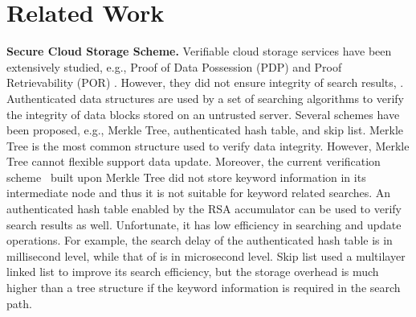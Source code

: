   \section{Related Work}
  \noindent\textbf{Secure Cloud Storage Scheme.} Verifiable cloud storage services have been extensively studied, e.g., Proof of Data Possession (PDP) \cite{ateniese2007provable, ateniese2008scalable, erway2015dynamic,zhu2012cooperative} and Proof  Retrievability (POR) \cite{juels2007pors, bowers2009proofs, stefanov2012iris}.  However, they did not ensure  integrity of search results,  .
  Authenticated data structures are used by a set of searching algorithms to verify the integrity of data blocks stored on an untrusted server. Several schemes have been proposed, e.g., Merkle Tree\cite{merkle1987digital}, authenticated hash table\cite{papamanthou2008authenticated}, and  skip list\cite{pugh1990skip,goodrich2001implementation}. Merkle Tree is the most common structure used to verify data integrity. However, Merkle Tree cannot flexible support data update. %
  Moreover, the current verification scheme~\cite{kamara2011cs2} built upon Merkle Tree did not store keyword information in its intermediate node and thus it is not suitable for keyword related searches. An authenticated hash table enabled by the RSA accumulator can be used to verify search results as well. Unfortunate, it has low efficiency in searching and update operations. For example, the search delay of the authenticated hash table is in millisecond level, while that of \name is in microsecond level. Skip list used a multilayer linked list to improve its search efficiency, but the storage overhead is much higher than a tree structure if the keyword information is required in the search path.

